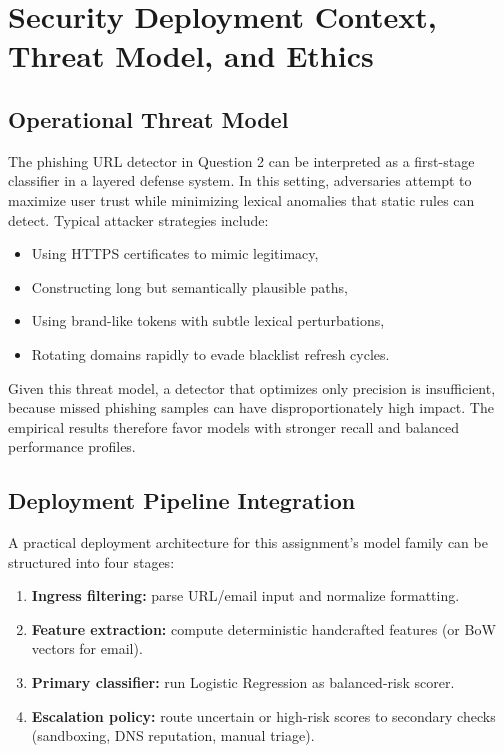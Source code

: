 \section{Security Deployment Context, Threat Model, and Ethics}

\subsection{Operational Threat Model}

The phishing URL detector in Question 2 can be interpreted as a first-stage classifier in a layered defense system. In this setting, adversaries attempt to maximize user trust while minimizing lexical anomalies that static rules can detect. Typical attacker strategies include:
\begin{itemize}
    \item Using HTTPS certificates to mimic legitimacy,
    \item Constructing long but semantically plausible paths,
    \item Using brand-like tokens with subtle lexical perturbations,
    \item Rotating domains rapidly to evade blacklist refresh cycles.
\end{itemize}

Given this threat model, a detector that optimizes only precision is insufficient, because missed phishing samples can have disproportionately high impact. The empirical results therefore favor models with stronger recall and balanced performance profiles.

\subsection{Deployment Pipeline Integration}

A practical deployment architecture for this assignment's model family can be structured into four stages:
\begin{enumerate}
    \item \textbf{Ingress filtering:} parse URL/email input and normalize formatting.
    \item \textbf{Feature extraction:} compute deterministic handcrafted features (or BoW vectors for email).
    \item \textbf{Primary classifier:} run Logistic Regression as balanced-risk scorer.
    \item \textbf{Escalation policy:} route uncertain or high-risk scores to secondary checks (sandboxing, DNS reputation, manual triage).
\end{enumerate}

